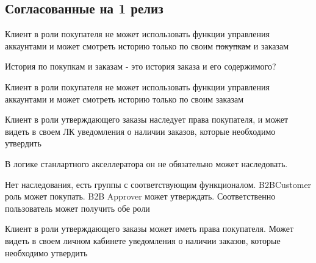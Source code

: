 \subsection{Согласованные на 1 релиз}
\fi
{}
{

\begin{wiki}
Клиент в роли покупателя не может использовать функции управления аккаунтами и может смотреть историю только по своим \sout{покупкам} и заказам
\end{wiki}

\begin{hybris}
История по покупкам и заказам - это история заказа и его содержимого?
\end{hybris}


\begin{itogo}
Клиент в роли покупателя не может использовать функции управления аккаунтами и может смотреть историю только по своим заказам
\end{itogo}




}
{


\begin{wiki}
Клиент в роли утверждающего заказы наследует права покупателя, и может видеть в своем ЛК уведомления о наличии заказов, которые необходимо утвердить
\end{wiki}

\begin{teamidea}
В логике станлартного акселлератора он не обязательно может наследовать.
\end{teamidea}

\begin{hybris}
Нет наследования, есть группы с соответствующим функционалом. B2BCustomer роль может покупать. B2B Approver может утверждать. Соответственно пользователь может получить обе роли
\end{hybris}


\begin{itogo}
Клиент в роли утверждающего заказы может иметь права покупателя. Может видеть в своем личном кабинете уведомления о наличии заказов, которые необходимо утвердить
\end{itogo}



}
